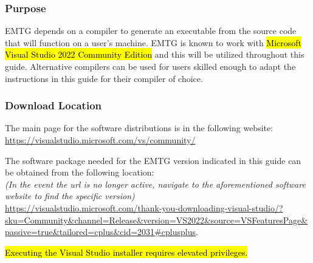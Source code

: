 
\subsubsection{Purpose}
\noindent \ac{EMTG} depends on a compiler to generate an executable from the source code that will function on a user's machine. \ac{EMTG} is known to work with \hl{Microsoft Visual Studio 2022 Community Edition} and this will be utilized throughout this guide. Alternative compilers can be used for users skilled enough to adapt the instructions in this guide for their compiler of choice.

\subsubsection{Download Location}
\noindent The main page for the software distributions is in the following website: \\
\url{https://visualstudio.microsoft.com/vs/community/}

\noindent The software package needed for the EMTG version indicated in this guide can be obtained from the following location: \\
\emph{(In the event the url is no longer active, navigate to the aforementioned software website to find the specific version)} \\
\url{https://visualstudio.microsoft.com/thank-you-downloading-visual-studio/?sku=Community&channel=Release&version=VS2022&source=VSFeaturesPage&passive=true&tailored=cplus&cid=2031#cplusplus}. 

\noindent \hl{Executing the Visual Studio installer requires elevated privileges.}

